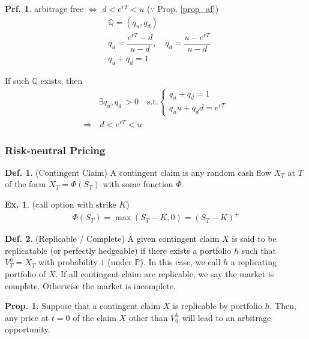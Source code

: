 \documentclass[a4paper,11pt]{jsarticle}
\theoremstyle{definition}
\newtheorem{definition}{Def.}[subsection]
\newtheorem{prf}{Prf.}[subsection]
\newtheorem{prop}{Prop.}[subsection]
\newtheorem{ex}{Ex.}[subsection]
\newcommand{\df}[2]{\dfrac{#1}{#2}}
\begin{document}
\begin{prf}
  arbitrage free $\Leftrightarrow$ $d<e^{rT}<u$
  ($\because$ Prop. \ref{prop_af}) \\
  \begin{align}
    &\mathbb{Q}=(q_u,q_d) \\
    &q_u=\df{e^{rT}-d}{u-d} , \quad
    q_d=\df{u-e^{rT}}{u-d} \\
    &q_u+q_d=1
  \end{align}

  If such $\mathbb{Q}$ exists, then
  \begin{align}
    & \exists q_u,q_d \, >0 \quad \mbox{s.t.}
    \begin{cases}
      q_u+q_d=1 \\
      q_u u + q_d d =e^{rT}
    \end{cases} \\
    \Rightarrow & \, d<e^{rT}<u
  \end{align}
\end{prf}

\subsubsection{Risk-neutral Pricing}
\begin{definition}{(Contingent Claim)}
  A contingent claim is any random cash flow $X_T$ at $T$
  of the form $X_T=\Phi(S_T)$ with some function $\Phi$.

  \begin{ex}{(call option with strike $K$)}
    \begin{align}
      \Phi(S_T)=\max(S_T-K,0)=(S_T-K)^{+}
    \end{align}
  \end{ex}
\end{definition}

\begin{definition}{(Replicable / Complete)}
  A given contingent claim $X$ is said to be replicatable
  (or perfectly hedgeable) if there exists a portfolio $h$
  such that $V_T^h=X_T$ with probability $1$ (under $\mathbb{P}$).
  In this case, we call $h$ a replicating portfolio of $X$.
  If all contingent claim are replicable, we say
  the market is complete. Otherwise the market is incomplete.
\end{definition}

\begin{prop}\label{prop_unique}
  Suppose that a contingent claim $X$ is replicable by
  portfolio $h$. Then, any price at $t=0$ of the claim $X$
  other than $V_0^h$ will lead to an arbitrage opportunity.
\end{prop}
\end{document}

